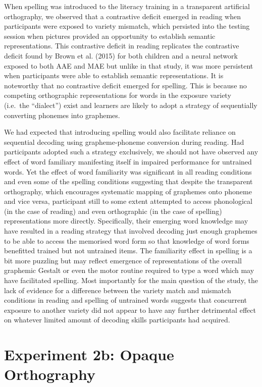 \documentclass[doc,floatsintext]{apa6}
\begin{document}
When spelling was introduced to the literacy training in a transparent
artificial orthography, we observed that a contrastive deficit emerged
in reading when participants were exposed to variety mismatch, which
persisted into the testing session when pictures provided an opportunity
to establish semantic representations. This contrastive deficit in
reading replicates the contrastive deficit found by Brown et al. (2015)
for both children and a neural network exposed to both AAE and MAE but
unlike in that study, it was more persistent when participants were able
to establish semantic representations. It is noteworthy that no
contrastive deficit emerged for spelling. This is because no competing
orthographic representations for words in the exposure variety (i.e.~the
\enquote{dialect}) exist and learners are likely to adopt a strategy of
sequentially converting phonemes into graphemes.

We had expected that introducing spelling would also facilitate reliance
on sequential decoding using grapheme-phoneme conversion during reading.
Had participants adopted such a strategy exclusively, we should not have
observed any effect of word familiary manifesting itself in impaired
performance for untrained words. Yet the effect of word familiarity was
significant in all reading conditions and even some of the spelling
conditions suggesting that despite the transparent orthography, which
encourages systematic mapping of graphemes onto phoneme and vice versa,
participant still to some extent attempted to access phonological (in
the case of reading) and even orthographic (in the case of spelling)
representations more directly. Specifically, their emerging word
knowledge may have resulted in a reading strategy that involved decoding
just enough graphemes to be able to access the memorised word form so
that knowledge of word forms benefitted trained but not untrained items.
The familiarity effect in spelling is a bit more puzzling but may
reflect emergence of representations of the overall graphemic Gestalt or
even the motor routine required to type a word which may have
facilitated spelling. Most importantly for the main question of the
study, the lack of evidence for a difference between the variety match
and mismatch conditions in reading and spelling of untrained words
suggests that concurrent exposure to another variety did not appear to
have any further detrimental effect on whatever limited amount of
decoding skills participants had acquired.

\section{Experiment 2b: Opaque
Orthography}\label{experiment-2b-opaque-orthography}
\end{document}
